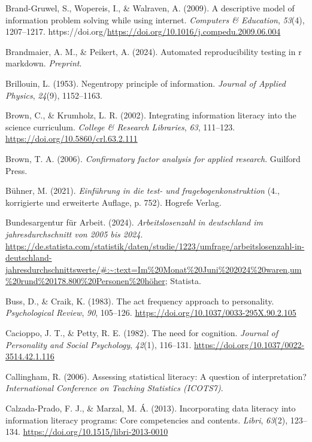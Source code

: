 \documentclass[
  12pt,
  a4paper,
  twoside]{article}
\newlength{\cslhangindent}
\newenvironment{CSLReferences}[2] %
 {\begin{list}{}{%
  \setlength{\itemindent}{0pt}
  \setlength{\leftmargin}{0pt}
  \setlength{\parsep}{0pt}
  \ifodd #1
   \setlength{\leftmargin}{\cslhangindent}
   \setlength{\itemindent}{-1\cslhangindent}
  \fi
  \setlength{\itemsep}{#2\baselineskip}}}
 {\end{list}}
\begin{document}
\begin{CSLReferences}{1}{0}
Brand-Gruwel, S., Wopereis, I., \& Walraven, A. (2009). A descriptive model of information problem solving while using internet. \emph{Computers \& Education}, \emph{53}(4), 1207--1217. https://doi.org/\url{https://doi.org/10.1016/j.compedu.2009.06.004}

Brandmaier, A. M., \& Peikert, A. (2024). Automated reproducibility testing in r markdown. \emph{Preprint}.

Brillouin, L. (1953). Negentropy principle of information. \emph{Journal of Applied Physics}, \emph{24}(9), 1152--1163.

Brown, C., \& Krumholz, L. R. (2002). Integrating information literacy into the science curriculum. \emph{College \& Research Libraries}, \emph{63}, 111--123. \url{https://doi.org/10.5860/crl.63.2.111}

Brown, T. A. (2006). \emph{Confirmatory factor analysis for applied research}. Guilford Press.

Bühner, M. (2021). \emph{Einführung in die test- und fragebogenkonstruktion} (4., korrigierte und erweiterte Auflage, p. 752). Hogrefe Verlag.

Bundesargentur für Arbeit. (2024). \emph{Arbeitslosenzahl in deutschland im jahresdurchschnitt von 2005 bis 2024}. \url{https://de.statista.com/statistik/daten/studie/1223/umfrage/arbeitslosenzahl-in-deutschland-jahresdurchschnittswerte/\#:~:text=Im\%20Monat\%20Juni\%202024\%20waren,um\%20rund\%20178.800\%20Personen\%20höher}; Statista.

Buss, D., \& Craik, K. (1983). The act frequency approach to personality. \emph{Psychological Review}, \emph{90}, 105--126. \url{https://doi.org/10.1037/0033-295X.90.2.105}

Cacioppo, J. T., \& Petty, R. E. (1982). The need for cognition. \emph{Journal of Personality and Social Psychology}, \emph{42}(1), 116--131. \url{https://doi.org/10.1037/0022-3514.42.1.116}

Callingham, R. (2006). Assessing statistical literacy: A question of interpretation? \emph{International Conference on Teaching Statistics (ICOTS7)}.

Calzada-Prado, F. J., \& Marzal, M. Á. (2013). Incorporating data literacy into information literacy programs: Core competencies and contents. \emph{Libri}, \emph{63}(2), 123--134. \url{https://doi.org/10.1515/libri-2013-0010}


\end{CSLReferences}
\end{document}
